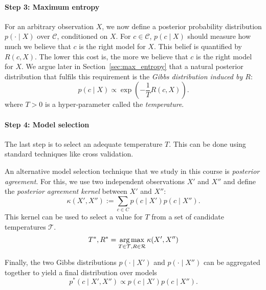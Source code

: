 \paragraph{Step 3: Maximum entropy} For an arbitrary observation $X$, we now define a posterior probability distribution $p(\cdot \mid X)$ over $\mathcal{C}$, conditioned on $X$. For $c \in \mathcal{C}$, $p(c \mid X)$ should measure how much we believe that $c$ is the right model for $X$. This belief is quantified by $R(c, X)$. The lower this cost is, the more we believe that $c$ is the right model for $X$. We argue later in Section~\ref{sec:max_entropy} that a natural posterior distribution that fulfils this requirement is the \emph{Gibbs distribution induced by $R$}:
%
\begin{equation}
p(c \mid X) \propto \exp\left(- \frac{1}{T} R(c, X)\right).
\label{eq:max_ent_dist}
\end{equation}
%
where $T > 0$ is a hyper-parameter called the \emph{temperature}.

\paragraph{Step 4: Model selection} The last step is to select an adequate temperature $T$. This can be done using standard techniques like cross validation. 

An alternative model selection technique that we study in this course is \emph{posterior agreement}. For this, we use two independent observations $X'$ and $X''$ and define the \emph{posterior agreement kernel} between $X'$ and $X''$:
%
\begin{equation}
\kappa(X', X'') := \sum_{c \in C} p(c \mid X') p(c \mid X'').
\label{eq:kernel_post_agr}
\end{equation}
%
This kernel can be used to select a value for $T$ from a set of candidate temperatures $\mathcal{T}$. 
%
\begin{equation}
T^*, R^* = \operatorname*{arg\,max}_{T \in \mathcal{T}, R \in \mathcal{R}} \kappa(X', X'')
\end{equation}

Finally, the two Gibbs distributions $p(\cdot \mid X')$ and $p(\cdot \mid X'')$ can be aggregated together to yield a final distribution over models
%
\begin{equation}
p^*(c \mid X', X'') \propto p(c \mid X')p(c \mid X'').
\label{eq:final_post_dist}
\end{equation}

